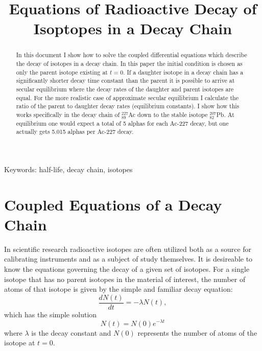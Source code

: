 \documentclass[11pt]{article}
\title{Equations of Radioactive Decay of Isoptopes in a Decay Chain}
\begin{document}
\maketitle


\begin{abstract}
In this document I show how to solve the coupled differential equations which describe the decay of isotopes in a decay chain. In this paper the initial condition is chosen as only the parent isotope existing at $t=0$. If a daughter isotope in a decay chain has a significantly shorter decay time constant than the parent it is possible to arrive at secular equilibrium where the decay rates of the daughter and parent isotopes are equal. For the more realistic case of approximate secular equilibrium I calculate the ratio of the parent to daughter decay rates (equilibrium constants). I show how this works specifically in the decay chain of $^{227}_{89}$Ac down to the stable isotope $^{207}_{82}$Pb. At equilibrium one would expect a total of 5 alphas for each Ac-227 decay, but one actually gets 5.015 alphas per Ac-227 decay. 
\end{abstract}


Keywords: half-life, decay chain, isotopes





\section{Coupled Equations of a Decay Chain}
\label{S:1}
In scientific research radioactive isotopes are often utilized both as a source for calibrating instruments and as a subject of study themselves. It is desireable to know the equations governing the decay of a given set of isotopes. For a single isotope that has no parent isotopes in the material of interest, the number of atoms of that isotope is given by the simple and familiar decay equation:
\begin{equation}
\label{eq:parent_decay_rate}
\frac{dN(t)}{dt}=-\lambda N(t),
\end{equation} 
which has the simple solution 
\begin{equation}
\label{eq:N0}
N(t)=N(0)e^{-\lambda t}
\end{equation}
where $\lambda$ is the decay constant and $N(0)$ represents the number of atoms of the isotope at $t=0$. 
\end{document}
